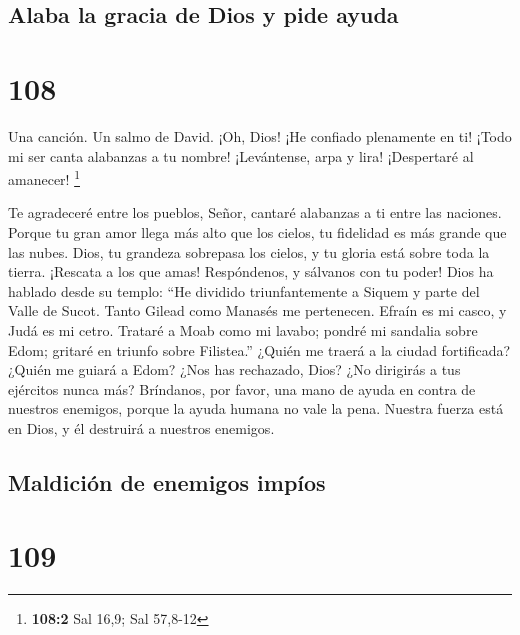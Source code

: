 \hypertarget{alaba-la-gracia-de-dios-y-pide-ayuda}{%
\subsection{Alaba la gracia de Dios y pide
ayuda}\label{alaba-la-gracia-de-dios-y-pide-ayuda}}

\hypertarget{section-107}{%
\section{108}\label{section-107}}

Una canción. Un salmo de David.  ¡Oh, Dios! ¡He confiado
plenamente en ti! ¡Todo mi ser canta alabanzas a tu nombre! 
¡Levántense, arpa y lira! ¡Despertaré al amanecer! \footnote{\textbf{108:2}
  Sal 16,9; Sal 57,8-12}

 Te agradeceré entre los pueblos, Señor, cantaré alabanzas a
ti entre las naciones.  Porque tu gran amor llega más alto
que los cielos, tu fidelidad es más grande que las nubes. 
Dios, tu grandeza sobrepasa los cielos, y tu gloria está sobre toda la
tierra.  ¡Rescata a los que amas! Respóndenos, y sálvanos
con tu poder!  Dios ha hablado desde su templo: ``He
dividido triunfantemente a Siquem y parte del Valle de Sucot.
 Tanto Gilead como Manasés me pertenecen. Efraín es mi
casco, y Judá es mi cetro.  Trataré a Moab como mi lavabo;
pondré mi sandalia sobre Edom; gritaré en triunfo sobre Filistea.''
 ¿Quién me traerá a la ciudad fortificada? ¿Quién me guiará
a Edom?  ¿Nos has rechazado, Dios? ¿No dirigirás a tus
ejércitos nunca más?  Bríndanos, por favor, una mano de
ayuda en contra de nuestros enemigos, porque la ayuda humana no vale la
pena.  Nuestra fuerza está en Dios, y él destruirá a
nuestros enemigos.

\hypertarget{maldiciuxf3n-de-enemigos-impuxedos}{%
\subsection{Maldición de enemigos
impíos}\label{maldiciuxf3n-de-enemigos-impuxedos}}

\hypertarget{section-108}{%
\section{109}\label{section-108}}

